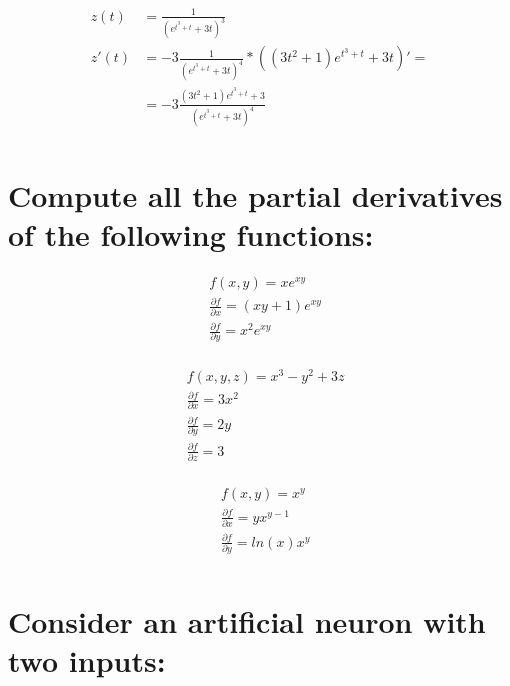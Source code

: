 \documentclass{article}
\begin{document}
\begin{equation}
\begin{split}
z(t) & = \frac{1}{{(e^{t^3+t} + 3t)}^3} \\
z'(t) & = -3\frac{1}{(e^{t^3 + t} + 3t)^4}*((3t^2 + 1)e^{t^3 + t} + 3t)' = \\ & = -3\frac{(3t^2 + 1)e^{t^3 + t} + 3}{(e^{t^3 + t} + 3t)^4} \\
\end{split}
\end{equation}



\section{\normalfont Compute all the partial derivatives of the following functions:}

\begin{equation}
\begin{split}
& f(x,y) = xe^{xy} \\
& \frac{\partial f}{\partial x} = (xy + 1)e^{xy} \\
& \frac{\partial f}{\partial y} = x^2e^{xy} \\
\end{split}
\end{equation}

\begin{equation}
\begin{split}
& f(x,y,z) = x^3 - y^2 + 3z\\
& \frac{\partial f}{\partial x} = 3x^2 \\
& \frac{\partial f}{\partial y} = 2y \\
& \frac{\partial f}{\partial z} = 3 \\
\end{split}
\end{equation}

\begin{equation}
\begin{split}
& f(x,y) = x^y \\
& \frac{\partial f}{\partial x} = yx^{y-1}\\
& \frac{\partial f}{\partial y} = ln(x)x^y \\
\end{split}
\end{equation}



\section{\normalfont Consider an artificial neuron with two inputs:}
\end{document}
